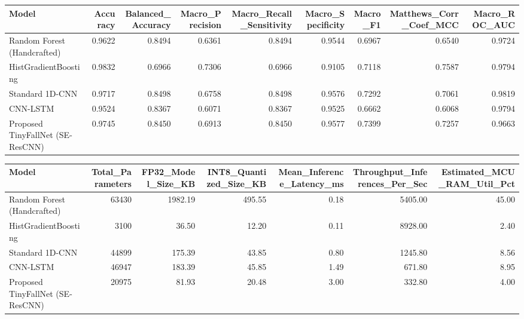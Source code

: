 \begin{tabular}{lrrrrrrrr}
\toprule
Model & Accuracy & Balanced_Accuracy & Macro_Precision & Macro_Recall_Sensitivity & Macro_Specificity & Macro_F1 & Matthews_Corr_Coef_MCC & Macro_ROC_AUC \\
\midrule
Random Forest (Handcrafted) & 0.9622 & 0.8494 & 0.6361 & 0.8494 & 0.9544 & 0.6967 & 0.6540 & 0.9724 \\
HistGradientBoosting & 0.9832 & 0.6966 & 0.7306 & 0.6966 & 0.9105 & 0.7118 & 0.7587 & 0.9794 \\
Standard 1D-CNN & 0.9717 & 0.8498 & 0.6758 & 0.8498 & 0.9576 & 0.7292 & 0.7061 & 0.9819 \\
CNN-LSTM & 0.9524 & 0.8367 & 0.6071 & 0.8367 & 0.9525 & 0.6662 & 0.6068 & 0.9794 \\
Proposed TinyFallNet (SE-ResCNN) & 0.9745 & 0.8450 & 0.6913 & 0.8450 & 0.9577 & 0.7399 & 0.7257 & 0.9663 \\
\bottomrule
\end{tabular}


\begin{tabular}{lrrrrrr}
\toprule
Model & Total_Parameters & FP32_Model_Size_KB & INT8_Quantized_Size_KB & Mean_Inference_Latency_ms & Throughput_Inferences_Per_Sec & Estimated_MCU_RAM_Util_Pct \\
\midrule
Random Forest (Handcrafted) & 63430 & 1982.19 & 495.55 & 0.18 & 5405.00 & 45.00 \\
HistGradientBoosting & 3100 & 36.50 & 12.20 & 0.11 & 8928.00 & 2.40 \\
Standard 1D-CNN & 44899 & 175.39 & 43.85 & 0.80 & 1245.80 & 8.56 \\
CNN-LSTM & 46947 & 183.39 & 45.85 & 1.49 & 671.80 & 8.95 \\
Proposed TinyFallNet (SE-ResCNN) & 20975 & 81.93 & 20.48 & 3.00 & 332.80 & 4.00 \\
\bottomrule
\end{tabular}


